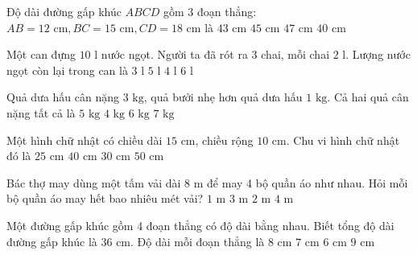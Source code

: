 \begin{ex} %
Độ dài đường gấp khúc $ABCD$ gồm 3 đoạn thẳng: $AB = 12\text{ cm}, BC = 15\text{ cm}, CD = 18\text{ cm}$ là
\choice
{$43\text{ cm}$}
{\True $45\text{ cm}$}
{$47\text{ cm}$}
{$40\text{ cm}$}
\end{ex}

\begin{ex} %
Một can đựng $10\text{ l}$ nước ngọt. Người ta đã rót ra 3 chai, mỗi chai $2\text{ l}$. Lượng nước ngọt còn lại trong can là
\choice
{$3\text{ l}$}
{$5\text{ l}$}
{\True $4\text{ l}$}
{$6\text{ l}$}
\end{ex}

\begin{ex} %
Quả dưa hấu cân nặng $3\text{ kg}$, quả bưởi nhẹ hơn quả dưa hấu $1\text{ kg}$. Cả hai quả cân nặng tất cả là
\choice
{\True $5\text{ kg}$}
{$4\text{ kg}$}
{$6\text{ kg}$}
{$7\text{ kg}$}
\end{ex}

\begin{ex} %
Một hình chữ nhật có chiều dài $15\text{ cm}$, chiều rộng $10\text{ cm}$. Chu vi hình chữ nhật đó là
\choice
{$25\text{ cm}$}
{$40\text{ cm}$}
{$30\text{ cm}$}
{\True $50\text{ cm}$}
\end{ex}

\begin{ex} %
Bác thợ may dùng một tấm vải dài $8\text{ m}$ để may 4 bộ quần áo như nhau. Hỏi mỗi bộ quần áo may hết bao nhiêu mét vải?
\choice
{$1\text{ m}$}
{$3\text{ m}$}
{\True $2\text{ m}$}
{$4\text{ m}$}
\end{ex}

\begin{ex} %
Một đường gấp khúc gồm 4 đoạn thẳng có độ dài bằng nhau. Biết tổng độ dài đường gấp khúc là $36\text{ cm}$. Độ dài mỗi đoạn thẳng là
\choice
{$8\text{ cm}$}
{$7\text{ cm}$}
{$6\text{ cm}$}
{\True $9\text{ cm}$}
\end{ex}

